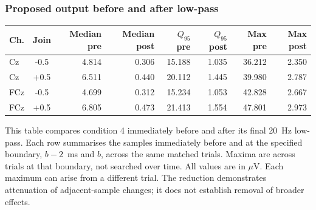 \documentclass[11pt,a4paper]{article}
\newcommand{\uv}{\ensuremath{\mu\mathrm{V}}}
\begin{document}
\clearpage\subsubsection{Proposed output before and after low-pass}
\begin{center}\small\begin{tabular}{lcrrrrrr}\toprule
Ch. & Join & Median pre & Median post & $Q_{95}$ pre & $Q_{95}$ post & Max pre & Max post \\
\midrule
Cz & -0.5 & 4.814 & 0.306 & 15.188 & 1.035 & 36.212 & 2.350 \\
Cz & +0.5 & 6.511 & 0.440 & 20.112 & 1.445 & 39.980 & 2.787 \\
FCz & -0.5 & 4.699 & 0.312 & 15.234 & 1.053 & 42.828 & 2.667 \\
FCz & +0.5 & 6.805 & 0.473 & 21.413 & 1.554 & 47.801 & 2.973 \\
\bottomrule\end{tabular}\end{center}
This table compares condition 4 immediately before and after its final 20~Hz low-pass. Each row summarises the samples immediately before and at the specified boundary, $b-2$~ms and $b$, across the same matched trials. Maxima are across trials at that boundary, not searched over time. All values are in \uv. Each maximum can arise from a different trial. The reduction demonstrates attenuation of adjacent-sample changes; it does not establish removal of broader effects.
\end{document}
